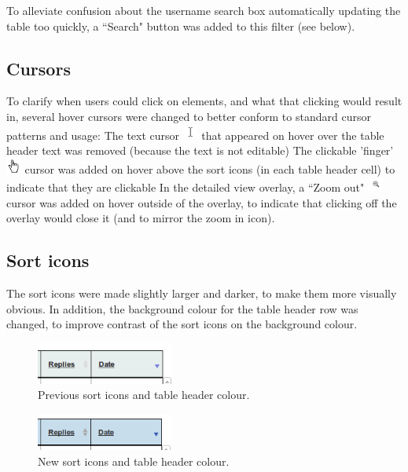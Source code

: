 To alleviate confusion about the username search box automatically updating the table too quickly, a ``Search" button was added to this filter (see below). 

\subsection{Cursors}
To clarify when users could click on elements, and what that clicking would result in, several hover cursors were changed to better conform to standard cursor patterns and usage:
The text cursor \includegraphics[width=0.5cm]{Figures/textcursor.png} that appeared on hover over the table header text was removed (because the text is not editable)
The clickable 'finger' \includegraphics[width=0.5cm]{Figures/handcursor.png} cursor was added on hover above the sort icons (in each table header cell) to indicate that they are clickable
In the detailed view overlay, a ``Zoom out"  \includegraphics[width=0.5cm]{Figures/V2/zoomout.png} cursor was added on hover outside of the overlay, to indicate that clicking off the overlay would close it (and to mirror the zoom in icon). 

\subsection{Sort icons}
The sort icons were made slightly larger and darker, to make them more visually obvious. In addition, the background colour for the table header row was changed, to improve contrast \citep[p. 650]{Galitz} of the sort icons on the background colour. 
\begin{figure}[h!]
    \centering
    \includegraphics[width=0.4\textwidth]{Figures/V2/oldsort.png}
 \caption{Previous sort icons and table header colour.}
\end{figure}

\begin{figure}[h!]
    \centering
    \includegraphics[width=0.4\textwidth]{Figures/V2/newsort.png}
 \caption{New sort icons and table header colour.}
\end{figure}

